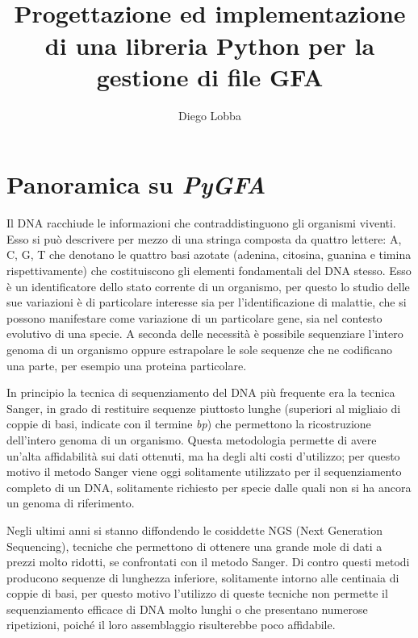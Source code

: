\documentclass[11pt, a4paper]{book}
\title{\pygfa \\
	Progettazione ed implementazione di una libreria Python per la gestione
	di file GFA}
\author{Diego Lobba}
\newcommand {\pygfa} {\textit{PyGFA}}
\begin{document}


\tableofcontents
\listoffigures

\chapter{Panoramica su \pygfa}

Il DNA racchiude le informazioni che contraddistinguono gli organismi
viventi. Esso si può descrivere per mezzo di una stringa composta da quattro
lettere: A, C, G, T che denotano le quattro basi azotate (adenina, citosina,
guanina e timina rispettivamente) che costituiscono gli elementi
fondamentali del DNA stesso. Esso è un identificatore dello stato
corrente di un organismo, per questo lo studio delle sue variazioni
è di particolare interesse sia per l'identificazione di malattie,
che si possono manifestare come variazione di un particolare gene,
sia nel contesto evolutivo di una specie. A seconda delle necessità
è possibile sequenziare l'intero genoma di un organismo oppure estrapolare
le sole sequenze che ne codificano una parte, per esempio una proteina
particolare.

In principio la tecnica di sequenziamento del DNA più frequente era la tecnica
Sanger, in grado di restituire sequenze piuttosto lunghe (superiori al migliaio di
coppie di basi, indicate con il termine \emph{bp}) che permettono la ricostruzione
dell'intero genoma di un organismo. Questa metodologia permette
di avere un'alta affidabilità sui dati ottenuti, ma ha degli alti costi d'utilizzo;
per questo motivo il metodo Sanger viene oggi solitamente utilizzato per
il sequenziamento completo di un DNA, solitamente richiesto per specie
dalle quali non si ha ancora un genoma di riferimento.

Negli ultimi anni si stanno diffondendo le cosiddette NGS (Next Generation Sequencing),
tecniche che permettono di ottenere una grande mole di dati
a prezzi molto ridotti, se confrontati con il metodo Sanger. Di contro questi
metodi producono sequenze di lunghezza inferiore, solitamente
intorno alle centinaia di coppie di basi, per questo motivo l'utilizzo di queste
tecniche non permette il sequenziamento efficace di DNA molto lunghi o che
presentano numerose ripetizioni, poiché il loro assemblaggio
risulterebbe poco affidabile.
\end{document}
